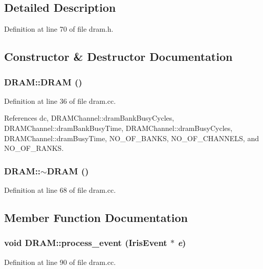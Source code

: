 \subsection{Detailed Description}


Definition at line 70 of file dram.h.

\subsection{Constructor \& Destructor Documentation}
\subsubsection[{DRAM}]{\setlength{\rightskip}{0pt plus 5cm}DRAM::DRAM ()}\label{classDRAM_d2edaff90ae758b53179bfa09075af9b}




Definition at line 36 of file dram.cc.

References dc, DRAMChannel::dramBankBusyCycles, DRAMChannel::dramBankBusyTime, DRAMChannel::dramBusyCycles, DRAMChannel::dramBusyTime, NO\_\-OF\_\-BANKS, NO\_\-OF\_\-CHANNELS, and NO\_\-OF\_\-RANKS.
\subsubsection[{$\sim$DRAM}]{\setlength{\rightskip}{0pt plus 5cm}DRAM::$\sim$DRAM ()}\label{classDRAM_0d19f4410081d5e4b807d64ba688511f}




Definition at line 68 of file dram.cc.

\subsection{Member Function Documentation}
\subsubsection[{process\_\-event}]{\setlength{\rightskip}{0pt plus 5cm}void DRAM::process\_\-event ({\bf IrisEvent} $\ast$ {\em e})}\label{classDRAM_a7fa043a15cf99d7916e0edb98546af5}




Definition at line 90 of file dram.cc.
